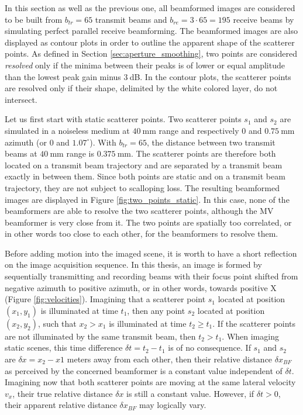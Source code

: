 In this section as well as the previous one, all beamformed images are considered to be built from $b_{tr} = 65$ transmit beams and $b_{re} = 3 \cdot 65 = 195$ receive beams by simulating perfect parallel receive beamforming. The beamformed images are also displayed as contour plots in order to outline the apparent shape of the scatterer points.
As defined in Section \ref{sec:aperture_smoothing}, two points are considered \textit{resolved} only if the minima between their peaks is of lower or equal amplitude than the lowest peak gain minus $3~$dB.
In the contour plots, the scatterer points are resolved only if their shape, delimited by the white colored layer, do not intersect.

Let us first start with static scatterer points. Two scatterer points $s_1$ and $s_2$ are simulated in a noiseless medium at $40~$mm range and respectively 0 and $0.75~$mm azimuth (or 0 and $1.07^\circ$).
With $b_{tr} = 65$, the distance between two transmit beams at $40~$mm range is $0.375~$mm. The scatterer points are therefore both located on a transmit beam trajectory and are separated by a transmit beam exactly in between them.
Since both points are static and on a transmit beam trajectory, they are not subject to scalloping loss.
The resulting beamformed images are displayed in Figure \ref{fig:two_points_static}.
In this case, none of the beamformers are able to resolve the two scatterer points, although the MV beamformer is very close from it. The two points are spatially too correlated, or in other words too close to each other, for the beamformers to resolve them.

Before adding motion into the imaged scene, it is worth to have a short reflection on the image acquisition sequence. In this thesis, an image is formed by sequentially transmitting and recording beams with their focus point shifted from negative azimuth to positive azimuth, or in other words, towards positive X (Figure \ref{fig:velocities}). Imagining that a scatterer point $s_1$ located at position $(x_1, y_1)$ is illuminated at time $t_1$, then any point $s_2$ located at position $(x_2, y_2)$, such that $x_2 > x_1$ is illuminated at time $t_2 \geq t_1$. If the scatterer points are not illuminated by the same transmit beam, then $t_2 > t_1$.
When imaging static scenes, this time difference $\delta t = t_2 - t_1$ is of no consequence. If $s_1$ and $s_2$ are $\delta x = x_2 - x1$ meters away from each other, then their relative distance $\delta x_{BF}$ as perceived by the concerned beamformer is a constant value independent of $\delta t$.
Imagining now that both scatterer points are moving at the same lateral velocity $v_x$, their true relative distance $\delta x$ is still a constant value. However, if $\delta t > 0$, their apparent relative distance $\delta x_{BF}$ may logically vary.


